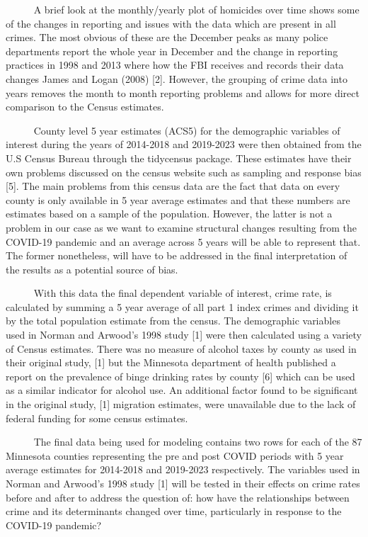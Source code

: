 \documentclass[
  11pt,
  letterpaper,
  DIV=11,
  numbers=noendperiod]{scrartcl}
\begin{document}
~~~~~ A brief look at the monthly/yearly plot of homicides over time
shows some of the changes in reporting and issues with the data which
are present in all crimes. The most obvious of these are the December
peaks as many police departments report the whole year in December and
the change in reporting practices in 1998 and 2013 where how the FBI
receives and records their data changes James and Logan (2008) {[}2{]}.
However, the grouping of crime data into years removes the month to
month reporting problems and allows for more direct comparison to the
Census estimates.\\
\strut ~~~~~ County level 5 year estimates (ACS5) for the demographic
variables of interest during the years of 2014-2018 and 2019-2023 were
then obtained from the U.S Census Bureau through the tidycensus package.
These estimates have their own problems discussed on the census website
such as sampling and response bias {[}5{]}. The main problems from this
census data are the fact that data on every county is only available in
5 year average estimates and that these numbers are estimates based on a
sample of the population. However, the latter is not a problem in our
case as we want to examine structural changes resulting from the
COVID-19 pandemic and an average across 5 years will be able to
represent that. The former nonetheless, will have to be addressed in the
final interpretation of the results as a potential source of bias.\\
\strut ~~~~~ With this data the final dependent variable of interest,
crime rate, is calculated by summing a 5 year average of all part 1
index crimes and dividing it by the total population estimate from the
census. The demographic variables used in Norman and Arwood's 1998 study
{[}1{]} were then calculated using a variety of Census estimates. There
was no measure of alcohol taxes by county as used in their original
study, {[}1{]} but the Minnesota department of health published a report
on the prevalence of binge drinking rates by county {[}6{]} which can be
used as a similar indicator for alcohol use. An additional factor found
to be significant in the original study, {[}1{]} migration estimates,
were unavailable due to the lack of federal funding for some census
estimates.\\
\strut ~~~~~ The final data being used for modeling contains two rows
for each of the 87 Minnesota counties representing the pre and post
COVID periods with 5 year average estimates for 2014-2018 and 2019-2023
respectively. The variables used in Norman and Arwood's 1998 study
{[}1{]} will be tested in their effects on crime rates before and after
to address the question of: how have the relationships between crime and
its determinants changed over time, particularly in response to the
COVID-19 pandemic?
\end{document}
